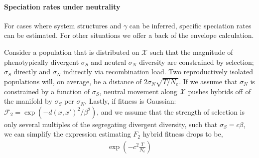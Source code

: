 \documentclass{article}
\newcommand{\plr}[1]{\todo[color=blue!25]{#1}}
\newcommand{\plr}[1]{{\color{blue}\it #1}}
\newcommand{\1}{\mathbbm{1}}
\newcommand{\Sys}{\mathcal{S}}
\newcommand{\fit}{\mathcal{F}}
\begin{document}
%
%
%
\paragraph{Speciation rates under neutrality}
For cases where system structures and $\gamma$ can be inferred,
specific speciation rates can be estimated.
For other situations we offer a back of the envelope calculation.

Consider a population that is distributed on $\mathcal{X}$ such that the magnitude of phenotypically
divergent $\sigma_S$ and neutral $\sigma_N$ diversity are constrained by selection;
$\sigma_S$ directly and $\sigma_N$ indirectly via recombination load.
Two reproductively isolated populations will, on average, be a distance of $2 \sigma_N \sqrt{T/N_e}$.
If we assume that $\sigma_N$ is constrained by a function of $\sigma_S$,
neutral movement along $\mathcal{X}$ pushes hybrids off of the manifold by $\sigma_S$ per $\sigma_N$,
Lastly, if fitness is Gaussian: $\fit_2 = \exp\left(- d(x, x')^2/\beta^2\right)$,
and we assume that the strength of selection is only several multiples of the segregating divergent diversity,
such that $\sigma_S = c \beta$, we can simplify the expression estimating $F_2$ hybrid fitness drops
to be,
  \begin{align}
    \exp\left(-c^2 \frac{T}{N_e} \right)
  \end{align}
%
\end{document}

